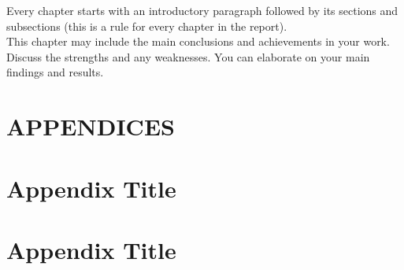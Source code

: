 \documentclass[10pt]{report}
\begin{document}
Every chapter starts with an introductory paragraph followed by its sections and subsections (this is a rule for every chapter in the report).\\

This chapter may include the main conclusions and achievements in your work. Discuss the strengths and any weaknesses. You can elaborate on your main findings and results. 



 
 

\centering
\vspace*{\fill}
\chapter*{APPENDICES}
\vspace*{\fill}

\newpage

\begin{appendices}
    \chapter{Appendix Title}
    \chapter{Appendix Title}
\end{appendices}
\end{document}
